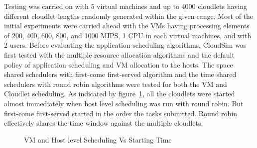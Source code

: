 \documentclass[times, 10pt,twocolumn]{article}
\begin{document}
Testing was carried on with 5 virtual machines and up to 4000 cloudlets having different cloudlet lengths randomly generated within the given range. Most of the initial experiments were carried ahead with the VMs having processing elements of 200, 400, 600, 800, and 1000 MIPS, 1 CPU in each virtual machines, and with 2 users.
Before evaluating the application scheduling algorithms, CloudSim was first tested with the multiple resource allocation algorithms and the default policy of application scheduling and VM allocation to the hosts. The space shared schedulers with first-come first-served algorithm and the time shared schedulers with round robin algorithms were tested for both the VM and Cloudlet scheduling. As indicated by figure~\ref{fig:start}, all the cloudlets were started almost immediately when host level scheduling was run with round robin. But first-come first-served started in the order the tasks submitted. Round robin effectively shares the time window against the multiple cloudlets. 
\begin{figure}[ht]
 \caption{VM and Host level Scheduling Vs Starting Time}
 \label{fig:start}
\end{figure}
\end{document}
